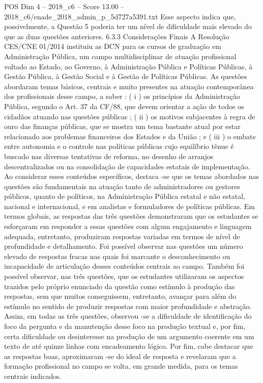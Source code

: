 \begin{textsample}{POS Dim 4 – 2018\_c6 – Score 13.00 – 2018\_c6/enade\_2018\_admin\_p\_5d727a5391.txt}
Esse aspecto indica que, possivelmente, a Questão 5 poderia ter um nível de dificuldade mais elevado do que as duas questões anteriores. 6.3.3 Considerações Finais A Resolução CES/CNE 01/2014 instituiu as DCN para os cursos de graduação em Administração Pública, um campo multidisciplinar de atuação profissional voltado ao Estado, ao Governo, à Administração Pública e Políticas Públicas, à Gestão Pública, à Gestão Social e à Gestão de Políticas Públicas.
As questões abordaram temas básicos, centrais e muito presentes na atuação contemporânea dos profissionais desse campo, a saber : ( i ) os princípios da Administração Pública, segundo o Art. 37 da CF/88, que devem orientar a ação de todos os cidadãos atuando nas questões públicas ; ( ii ) os motivos subjacentes à regra de ouro das finanças públicas, que se mostra um tema bastante atual por estar relacionado aos problemas financeiros dos Estados e da União ; e ( iii ) o embate entre autonomia e o controle nas políticas públicas cujo equilíbrio tênue é buscado nas diversas tentativas de reforma, no desenho de arranjos descentralizados ou na consolidação de capacidades estatais de implementação.
Ao considerar esses conteúdos específicos, destaca -se que os temas abordados nas questões são fundamentais na atuação tanto de administradores ou gestores públicos, quanto de políticos, na Administração Pública estatal e não estatal, nacional e internacional, e em analistas e formuladores de políticas públicas.
Em termos globais, as respostas das três questões demonstraram que os estudantes se esforçaram em responder a essas questões com algum engajamento e linguagem adequada, entretanto, produziram respostas variadas em termos de nível de profundidade e detalhamento.
Foi possível observar nas questões um número elevado de respostas fracas nas quais foi marcante o desconhecimento ou incapacidade de articulação desses conteúdos centrais ao campo.
Também foi possível observar, nas três questões, que os estudantes utilizaram os aspectos trazidos pelo próprio enunciado da questão como estímulo à produção das respostas, sem que muitos conseguissem, entretanto, avançar para além do estímulo no sentido de produzir respostas com maior profundidade e abstração.
Assim, em todas as três questões, observou -se a dificuldade de identificação do foco da pergunta e da manutenção desse foco na produção textual e, por fim, certa dificuldade ou desinteresse na produção de um argumento coerente em um texto de até quinze linhas com encadeamento lógico.
Por fim, cabe destacar que as respostas boas, aproximaram -se do ideal de resposta e revelaram que a formação profissional no campo se volta, em grande medida, para os temas centrais indicados.

\end{textsample}
